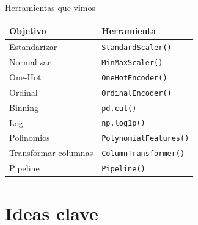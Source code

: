 \documentclass[aspectratio=169,11pt]{beamer}
\begin{document}
\begin{frame}{Herramientas que vimos}

\scriptsize

\begin{table}
\centering

\begin{tabular}{ll}
\toprule
\textbf{Objetivo} & \textbf{Herramienta} \\
\midrule

Estandarizar &
\texttt{StandardScaler()} \\

Normalizar &
\texttt{MinMaxScaler()} \\

One-Hot &
\texttt{OneHotEncoder()} \\

Ordinal &
\texttt{OrdinalEncoder()} \\

Binning &
\texttt{pd.cut()} \\

Log &
\texttt{np.log1p()} \\

Polinomios &
\texttt{PolynomialFeatures()} \\

Transformar columnas &
\texttt{ColumnTransformer()} \\

Pipeline &
\texttt{Pipeline()} \\

\bottomrule
\end{tabular}

\end{table}

\end{frame}

\section{Ideas clave}
\end{document}
